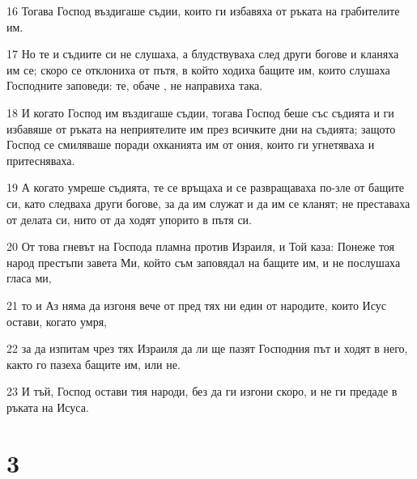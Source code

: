 \par 16 Тогава Господ въздигаше съдии, които ги избавяха от ръката на грабителите им.
\par 17 Но те и съдиите си не слушаха, а блудствуваха след други богове и кланяха им се; скоро се отклониха от пътя, в който ходиха бащите им, които слушаха Господните заповеди: те, обаче , не направиха така.
\par 18 И когато Господ им въздигаше съдии, тогава Господ беше със съдията и ги избавяше от ръката на неприятелите им през всичките дни на съдията; защото Господ се смиляваше поради охканията им от ония, които ги угнетяваха и притесняваха.
\par 19 А когато умреше съдията, те се връщаха и се развращаваха по-зле от бащите си, като следваха други богове, за да им служат и да им се кланят; не преставаха от делата си, нито от да ходят упорито в пътя си.
\par 20 От това гневът на Господа пламна против Израиля, и Той каза: Понеже тоя народ престъпи завета Ми, който съм заповядал на бащите им, и не послушаха гласа ми,
\par 21 то и Аз няма да изгоня вече от пред тях ни един от народите, които Исус остави, когато умря,
\par 22 за да изпитам чрез тях Израиля да ли ще пазят Господния път и ходят в него, както го пазеха бащите им, или не.
\par 23 И тъй, Господ остави тия народи, без да ги изгони скоро, и не ги предаде в ръката на Исуса.

\chapter{3}

